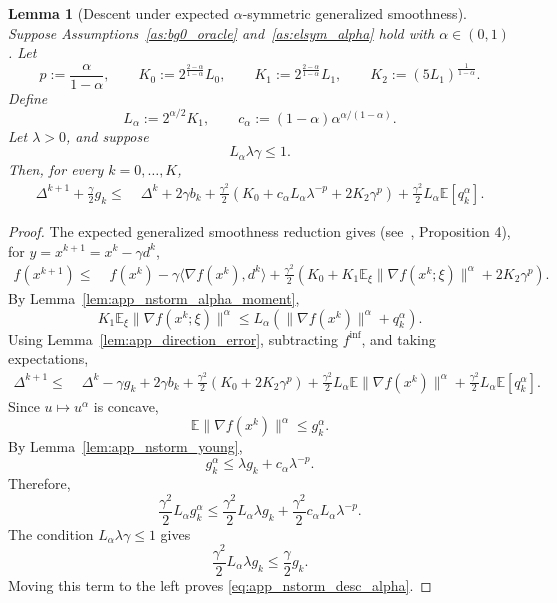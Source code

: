 \documentclass[letter,11pt]{article}
\newtheorem{lemma}[]{Lemma}
\newcommand{\E}{\mathbb{E}}
\begin{document}
\begin{lemma}[Descent under expected \(\alpha\)-symmetric generalized smoothness]
\label{lem:app_nstorm_desc_alpha}
Suppose Assumptions~\ref{as:bg0_oracle} and~\ref{as:elsym_alpha} hold with
\(\alpha\in(0,1)\). Let
\[
    p:=\frac{\alpha}{1-\alpha},
    \qquad
    K_0:=2^{\frac{2-\alpha}{1-\alpha}}L_0,
    \qquad
    K_1:=2^{\frac{2-\alpha}{1-\alpha}}L_1,
    \qquad
    K_2:=(5L_1)^{\frac1{1-\alpha}}.
\]
Define
\[
    L_\alpha:=2^{\alpha/2}K_1,
    \qquad
    c_\alpha:=(1-\alpha)\alpha^{\alpha/(1-\alpha)}.
\]
Let \(\lambda>0\), and suppose
\[
    L_\alpha\lambda\gamma\le1.
\]
Then, for every \(k=0,\ldots,K\),
\begin{equation}
\label{eq:app_nstorm_desc_alpha}
\begin{aligned}
    \Delta^{k+1}
    +
    \frac{\gamma}{2}g_k
    \le\;&
    \Delta^k
    +
    2\gamma b_k
    +
    \frac{\gamma^2}{2}
    \left(
        K_0
        +
        c_\alpha L_\alpha\lambda^{-p}
        +
        2K_2\gamma^p
    \right)
    +
    \frac{\gamma^2}{2}L_\alpha\E[q_k^\alpha].
\end{aligned}
\end{equation}
\end{lemma}

\begin{proof}
The expected generalized smoothness reduction gives (see~\citet{chen2023generalized}, Proposition 4), for
\(y=x^{k+1}=x^k-\gamma d^k\),
\[
\begin{aligned}
    f(x^{k+1})
    \le\;&
    f(x^k)
    -
    \gamma\langle \nabla f(x^k),d^k\rangle 
    +
    \frac{\gamma^2}{2}
    \left(
        K_0
        +
        K_1\E_\xi\|\nabla f(x^k;\xi)\|^\alpha
        +
        2K_2\gamma^p
    \right).
\end{aligned}
\]
By Lemma~\ref{lem:app_nstorm_alpha_moment},
\[
    K_1\E_\xi\|\nabla f(x^k;\xi)\|^\alpha
    \le
    L_\alpha
    \left(
        \|\nabla f(x^k)\|^\alpha+q_k^\alpha
    \right).
\]
Using Lemma~\ref{lem:app_direction_error}, subtracting \(f^{\inf}\), and
taking expectations,
\[
\begin{aligned}
    \Delta^{k+1}
    \le\;&
    \Delta^k
    -
    \gamma g_k
    +
    2\gamma b_k
    +
    \frac{\gamma^2}{2}
    \left(
        K_0+2K_2\gamma^p
    \right) 
    +
    \frac{\gamma^2}{2}L_\alpha
    \E\|\nabla f(x^k)\|^\alpha
    +
    \frac{\gamma^2}{2}L_\alpha\E[q_k^\alpha].
\end{aligned}
\]
Since \(u\mapsto u^\alpha\) is concave,
\[
    \E\|\nabla f(x^k)\|^\alpha
    \le
    g_k^\alpha.
\]
By Lemma~\ref{lem:app_nstorm_young},
\[
    g_k^\alpha
    \le
    \lambda g_k+c_\alpha\lambda^{-p}.
\]
Therefore,
\[
    \frac{\gamma^2}{2}L_\alpha g_k^\alpha
    \le
    \frac{\gamma^2}{2}L_\alpha\lambda g_k
    +
    \frac{\gamma^2}{2}c_\alpha L_\alpha\lambda^{-p}.
\]
The condition \(L_\alpha\lambda\gamma\le1\) gives
\[
    \frac{\gamma^2}{2}L_\alpha\lambda g_k
    \le
    \frac{\gamma}{2}g_k.
\]
Moving this term to the left proves \eqref{eq:app_nstorm_desc_alpha}.
\end{proof}
\end{document}
